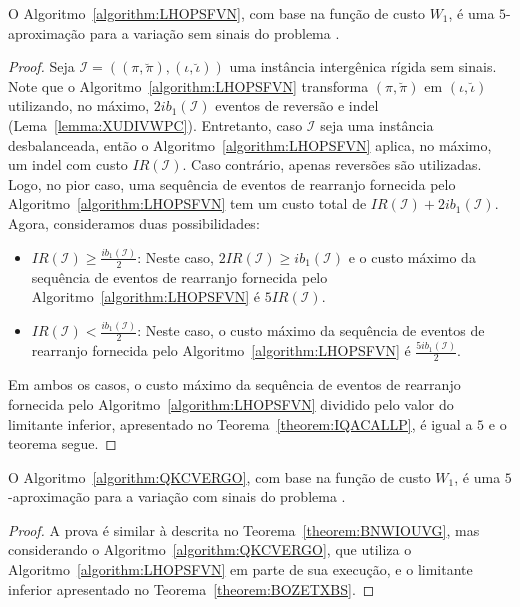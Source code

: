 \begin{theorem}\label{theorem:BNWIOUVG}
O Algoritmo~\ref{algorithm:LHOPSFVN}, com base na função de custo $W_1$, é uma $5$-aproximação para a variação sem sinais do problema \SbWIRI{}.
\end{theorem}
\begin{proof}
Seja $\mathcal{I} = ((\pi,\breve\pi),(\iota,\breve\iota))$ uma instância intergênica rígida sem sinais. Note que o Algoritmo~\ref{algorithm:LHOPSFVN} transforma $(\pi,\breve\pi)$ em $(\iota,\breve\iota)$ utilizando, no máximo, $2ib_1(\mathcal{I})$ eventos de reversão e indel (Lema~\ref{lemma:XUDIVWPC}). Entretanto, caso $\mathcal{I}$ seja uma instância desbalanceada, então o Algoritmo~\ref{algorithm:LHOPSFVN} aplica, no máximo, um indel com custo $IR(\mathcal{I})$. Caso contrário, apenas reversões são utilizadas. Logo, no pior caso, uma sequência de eventos de rearranjo fornecida pelo Algoritmo~\ref{algorithm:LHOPSFVN} tem um custo total de $IR(\mathcal{I}) + 2ib_1(\mathcal{I})$. Agora, consideramos duas possibilidades:
\begin{itemize}
  \item $IR(\mathcal{I}) \ge \frac{ib_1(\mathcal{I})}{2}$: Neste caso, $2IR(\mathcal{I}) \ge ib_1(\mathcal{I})$ e o custo máximo da sequência de eventos de rearranjo fornecida pelo Algoritmo~\ref{algorithm:LHOPSFVN} é $5IR(\mathcal{I})$.
  \item $IR(\mathcal{I}) < \frac{ib_1(\mathcal{I})}{2}$: Neste caso, o custo máximo da sequência de eventos de rearranjo fornecida pelo Algoritmo~\ref{algorithm:LHOPSFVN} é $\frac{5ib_1(\mathcal{I})}{2}$.
\end{itemize}
Em ambos os casos, o custo máximo da sequência de eventos de rearranjo fornecida pelo Algoritmo~\ref{algorithm:LHOPSFVN} dividido pelo valor do limitante inferior, apresentado no Teorema~\ref{theorem:IQACALLP}, é igual a $5$ e o teorema segue.
\end{proof}

\begin{theorem}\label{theorem:JKFXFCMF}
O Algoritmo~\ref{algorithm:QKCVERGO}, com base na função de custo $W_1$, é uma $5$-aproximação para a variação com sinais do problema \SbWIRI{}.
\end{theorem}
\begin{proof}
A prova é similar à descrita no Teorema~\ref{theorem:BNWIOUVG}, mas considerando o Algoritmo~\ref{algorithm:QKCVERGO}, que utiliza o Algoritmo~\ref{algorithm:LHOPSFVN} em parte de sua execução, e o limitante inferior apresentado no Teorema~\ref{theorem:BOZETXBS}.
\end{proof}

